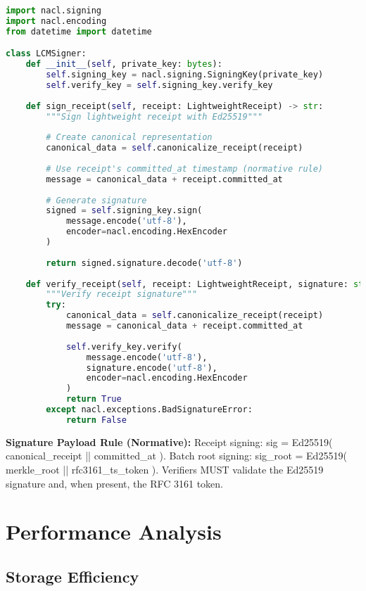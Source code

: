 \documentclass[12pt,a4paper]{article}
\begin{document}
\begin{lstlisting}[language=Python, caption=Ed25519 Signature Implementation]
import nacl.signing
import nacl.encoding
from datetime import datetime

class LCMSigner:
    def __init__(self, private_key: bytes):
        self.signing_key = nacl.signing.SigningKey(private_key)
        self.verify_key = self.signing_key.verify_key
    
    def sign_receipt(self, receipt: LightweightReceipt) -> str:
        """Sign lightweight receipt with Ed25519"""
        
        # Create canonical representation
        canonical_data = self.canonicalize_receipt(receipt)
        
        # Use receipt's committed_at timestamp (normative rule)
        message = canonical_data + receipt.committed_at
        
        # Generate signature
        signed = self.signing_key.sign(
            message.encode('utf-8'),
            encoder=nacl.encoding.HexEncoder
        )
        
        return signed.signature.decode('utf-8')
    
    def verify_receipt(self, receipt: LightweightReceipt, signature: str) -> bool:
        """Verify receipt signature"""
        try:
            canonical_data = self.canonicalize_receipt(receipt)
            message = canonical_data + receipt.committed_at
            
            self.verify_key.verify(
                message.encode('utf-8'),
                signature.encode('utf-8'),
                encoder=nacl.encoding.HexEncoder
            )
            return True
        except nacl.exceptions.BadSignatureError:
            return False
\end{lstlisting}

\textbf{Signature Payload Rule (Normative):} Receipt signing: sig = Ed25519( canonical\_receipt || committed\_at ). Batch root signing: sig\_root = Ed25519( merkle\_root || rfc3161\_ts\_token ). Verifiers MUST validate the Ed25519 signature and, when present, the RFC 3161 token.

\section{Performance Analysis}

\subsection{Storage Efficiency}
\end{document}
